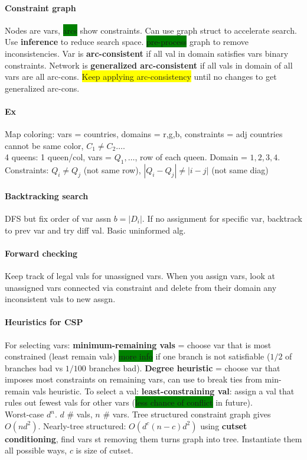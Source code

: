 \paragraph{Constraint graph}Nodes are vars, \colorbox{green}{arcs}
show constraints. Can use graph struct to accelerate search. Use
\textbf{inference} to reduce search
space. \colorbox{green}{pre-process} graph to remove
inconsistencies. Var is \textbf{arc-consistent} if all val in domain
satisfies vars binary constraints. Network is \textbf{generalized
  arc-consistent} if all vals in domain of all vars are all
arc-cons. \colorbox{yellow}{Keep applying arc-consistency} until no
changes to get generalized arc-cons.
\paragraph{Ex} Map coloring: vars = countries, domains = r,g,b,
constraints = adj countries cannot be same color, $C_1 \neq C_2
\ldots$.
\\ 4 queens: 1 queen/col, vars = $Q_1, \ldots$, row of each
queen. Domain = ${1,2,3,4}$. Constraints: $Q_i \neq Q_j$ (not same
row), $|Q_i-Q_j| \neq |i-j|$ (not same diag)
\paragraph{Backtracking search} DFS but fix order of var assn $b =
|D_i|$. If no assignment for specific var, backtrack to prev var and
try diff val. Basic uninformed alg.
\paragraph{Forward checking} Keep track of legal vals for unassigned
vars. When you assign vars, look at unassigned vars connected via
constraint and delete from their domain any inconsistent vals to new
assgn.
\paragraph{Heuristics for CSP} For selecting vars:
\textbf{minimum-remaining vals} = choose var that is most
constrained (least remain vals) \colorbox{green}{more info} if one branch is not
satisfiable ($1/2$ of branches bad vs $1/100$ branches bad). \textbf{Degree heuristic} = choose var that imposes most
constraints on remaining vars, can use to break ties from min-remain
vals heuristic. To select a val: \textbf{least-constraining val}:
assign a val that rules out fewest vals for other vars
(\colorbox{green}{less chance of conflict} in future).
\\ Worst-case $d^n$. $d$ \# vals, $n$ \# vars. Tree structured constraint graph gives
$O(nd^2)$. Nearly-tree structured: $O(d^c(n-c)d^2)$ using
\textbf{cutset conditioning}, find vars st removing them turns graph
into tree. Instantiate them all possible ways, $c$ is size of cutset.
